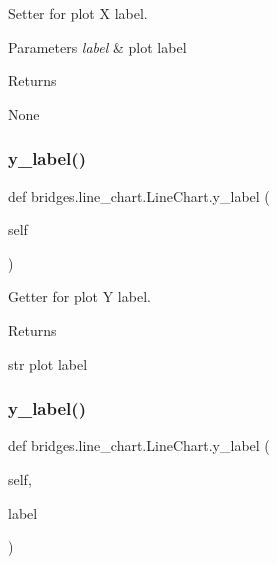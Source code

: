 Setter for plot X label. 


\begin{DoxyParams}{Parameters}
{\em label} & plot label \\
\hline
\end{DoxyParams}
\begin{DoxyReturn}{Returns}


None 
\end{DoxyReturn}
\mbox{\label{classbridges_1_1line__chart_1_1_line_chart_a53234b2386393ec400bfbc969e8a5bf2}} 
\subsubsection{\texorpdfstring{y\_label()}{y\_label()}\hspace{0.1cm}{\footnotesize\ttfamily [1/2]}}
{\footnotesize\ttfamily def bridges.\+line\+\_\+chart.\+Line\+Chart.\+y\+\_\+label (\begin{DoxyParamCaption}\item[{}]{self }\end{DoxyParamCaption})}



Getter for plot Y label. 

\begin{DoxyReturn}{Returns}


str plot label 
\end{DoxyReturn}
\mbox{\label{classbridges_1_1line__chart_1_1_line_chart_a13a80664727dc3302e7f7d4b29b58833}} 
\subsubsection{\texorpdfstring{y\_label()}{y\_label()}\hspace{0.1cm}{\footnotesize\ttfamily [2/2]}}
{\footnotesize\ttfamily def bridges.\+line\+\_\+chart.\+Line\+Chart.\+y\+\_\+label (\begin{DoxyParamCaption}\item[{}]{self,  }\item[{}]{label }\end{DoxyParamCaption})}



